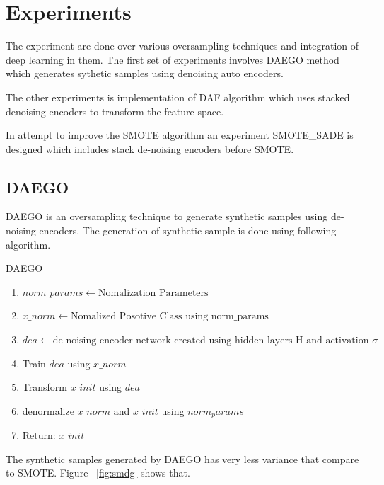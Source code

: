 \documentclass[a4paper,11pt]{report}
\begin{document}
\chapter*{Experiments}

The experiment are done over various oversampling techniques and integration of deep learning in them. The first set of experiments involves DAEGO\cite{bellinger2015synthetic} method which generates sythetic samples using denoising auto encoders\cite{vincent2010stacked}. 

The other experiments is implementation of DAF\cite{ng2016dual} algorithm which uses stacked denoising encoders to transform the feature space.

In attempt to improve the SMOTE algorithm an experiment SMOTE\_SADE is designed which includes stack de-noising encoders before SMOTE.

\section*{DAEGO}

DAEGO\cite{bellinger2015synthetic} is an oversampling technique to generate synthetic samples using de-noising encoders. The generation of synthetic sample is done using following algorithm.

\begin{algorithm}
\caption{DAEGO}\label{euclid}
\begin{algorithmic}

\begin{enumerate}
    \item {\state $norm\_params \gets \text{Nomalization Parameters}$}
    \item {\state $x\_norm \gets \text{Nomalized Posotive Class using $$norm\_params$$}$}
    \item {\state $dea \gets \text{de-noising encoder network created using hidden layers H and activation $\sigma$}$}
    \item {Train $dea$ using $x\_norm$}
    \item {Transform $x\_init$ using $dea$}
    \item {denormalize $x\_norm$ and $x\_init$ using $norm_params$}
    \item {Return: $x\_init$  }
\end{enumerate}

\end{algorithmic}
\end{algorithm}

The synthetic samples generated by DAEGO has very less variance that compare to SMOTE\cite{chawla2002smote}. Figure ~\ref{fig:smdg} shows that.
\end{document}
